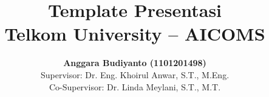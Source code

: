%

\title[Template Presentasi Telkom University]{%
  \textbf{Template Presentasi\\Telkom University -- AICOMS}}


\author[Anggara Budiyanto]{%
  \textbf{Anggara Budiyanto (1101201498)} \\[2pt]
  {\footnotesize Supervisor: Dr. Eng. Khoirul Anwar, S.T., M.Eng.} \\
  {\footnotesize Co-Supervisor: Dr. Linda Meylani, S.T., M.T.}}


